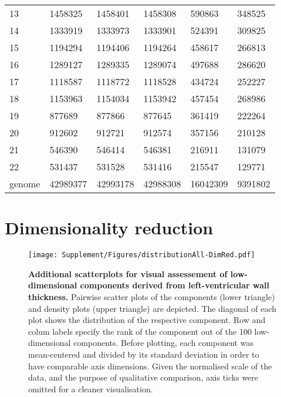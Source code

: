 \begin{table}[htbp]
\begin{tabular}{llllll}
    \num{13} & \num{1458325} & \num{1458401} & \num{1458308} & \num{590863} & \num{348525} \\
    \num{14} & \num{1333919} & \num{1333973} & \num{1333901} & \num{524391} & \num{309825} \\
    \num{15} & \num{1194294} & \num{1194406} & \num{1194264} & \num{458617} & \num{266813} \\
    \num{16} & \num{1289127} & \num{1289335} & \num{1289074} & \num{497688} & \num{286620} \\
    \num{17} & \num{1118587} & \num{1118772} & \num{1118528} & \num{434724} & \num{252227} \\
    \num{18} & \num{1153963} & \num{1154034} & \num{1153942} & \num{457454} & \num{268986} \\
    \num{19} & \num{877689} & \num{877866} & \num{877645} & \num{361419} & \num{222264} \\
    \num{20} & \num{912602} & \num{912721} & \num{912574} & \num{357156} & \num{210128} \\
    \num{21} & \num{546390} & \num{546414} & \num{546381} & \num{216911} & \num{131079} \\
    \num{22} & \num{531437} & \num{531528} & \num{531416} & \num{215547} & \num{129771} \\
    \midrule
    genome & \num{42989377} & \num{42993178} & \num{42988308} & \num{16042309} & \num{9391802} \\
    \bottomrule
    \end{tabular}%
  \label{tab:imputationQC}%
\end{table}%

\newpage
\section{Dimensionality reduction}
\begin{figure}[hbtp]
	\centering
	\texttt{[image: Supplement/Figures/distributionAll-DimRed.pdf]}
	\caption[\textbf{Additional scatterplots for visual assessement of low-dimensional components derived from left-ventricular wall thickness. }]{\textbf{Additional scatterplots for visual assessement of low-dimensional components derived from left-ventricular wall thickness. }Pairwise scatter plots of the components (lower triangle) and density plots (upper triangle) are depicted. The diagonal of each plot shows the distribution of the respective component. Row and colum labels specify the rank of the component out of the \num{100} low-dimensional components. Before plotting, each component was mean-centered and divided by its standard deviation in order to have comparable axis dimensions. Given the normalised scale of the data, and the purpose of qualitative comparison, axis ticks were omitted for a cleaner visualisation. }
	 	\label{fig:distributionAll-DimRed}
\end{figure}

